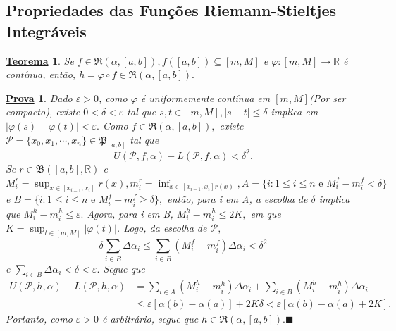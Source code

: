 \documentclass{article}
\newtheorem*{theorem*}{\underline{Teorema}}
\newtheorem*{proof*}{\underline{Prova}}
\renewcommand\qedsymbol{$\blacksquare$}
\begin{document}
\subsection{Propriedades das Fun\c cões Riemann-Stieltjes Integráveis}
 \begin{theorem*}
   Se \(f\in \mathfrak{R}(\alpha ,[a,b]), f([a, b])\subseteq{[m, M]}\) e \(\varphi :[m, M]\rightarrow \mathbb{R}\) é contínua,
   então, \(h=\varphi\circ{f}\in \mathfrak{R}(\alpha , [a,b]).\)
 \end{theorem*}
\begin{proof*}
  Dado \(\varepsilon >0\), como \(\varphi \) é uniformemente contínua em \([m, M]\)(Por ser compacto),
existe \(0 < \delta  < \varepsilon \) tal que \(s, t\in[m, M], |s-t|\leq \delta \) implica em \(|\varphi (s)-\varphi (t)| < \varepsilon .\)
Como \(f\in \mathfrak{R}(\alpha , [a, b]),\) existe \(\mathcal{P} = \{x_{0}, x_{1}, \cdots, x_{n}\}\in \mathfrak{P}_{[a, b]}\) tal que  
  \[
    U(\mathcal{P}, f, \alpha ) - L(\mathcal{P}, f, \alpha ) < \delta^{2}.
  \]
Se \(r\in \mathfrak{B}([a, b], \mathbb{R})\) e \(M_{i}^{r} = \sup_{x\in[x_{i-1}, x_{i}]}r(x), m_{i}^{r} = \inf_{x\in[x_{i-1}, x_{i}]r(x)}, 
A = \{i: 1\leq i\leq n\text{ e } M_{i}^{f}-m_{i}^{f} < \delta \}\) e \(B = \{i: 1\leq i\leq n\text{ e } M_{i}^{f}-m_{i}^{f}\geq \delta\},\) então,
para i em A, a escolha de \(\delta \) implica que \(M_{i}^{h} - m_{i}^{h}\leq \varepsilon .\) Agora, para i em B,
\(M_{i}^{h}-m_{i}^{h}\leq 2K,\) em que \(K=\sup_{t\in[m, M]}|\varphi (t)|\). Logo, da escolha de \(\mathcal{P},\) 
  \[
    \delta \sum\limits_{i\in B}^{}\Delta \alpha_{i}\leq \sum\limits_{i\in B}^{}(M_{i}^{f}-m_{i}^{f})\Delta \alpha_{i} < \delta^{2}
  \]
e \(\sum\limits_{i\in B}^{}\Delta\alpha_{i} < \delta <\varepsilon .\) Segue que 
\begin{align*}
  U(\mathcal{P}, h, \alpha ) - L(\mathcal{P}, h, \alpha ) &= \sum\limits_{i\in A}^{}(M_{i}^{h}-m_{i}^{h})\Delta \alpha_{i} + \sum\limits_{i\in B}^{}(M_{i}^{h}-m_{i}^{h})\Delta\alpha_{i} \\
                                                          &\leq \varepsilon [\alpha (b)-\alpha (a)]+2K\delta < \varepsilon [\alpha (b)-\alpha (a)+2K].
\end{align*}
  Portanto, como \(\varepsilon >0\) é arbitrário, segue que \(h\in \mathfrak{R}(\alpha , [a, b]).\)\qedsymbol
   
\end{proof*}
\end{document}

